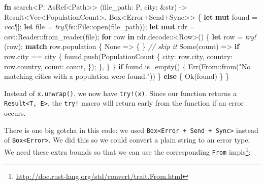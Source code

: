 \documentclass[a4paper,]{book}
\newenvironment{Shaded}{\begin{snugshade}}{\end{snugshade}}
\newcommand{\KeywordTok}[1]{\textcolor[rgb]{0.13,0.29,0.53}{\textbf{{#1}}}}
\newcommand{\DataTypeTok}[1]{\textcolor[rgb]{0.13,0.29,0.53}{{#1}}}
\newcommand{\ConstantTok}[1]{\textcolor[rgb]{0.00,0.00,0.00}{{#1}}}
\newcommand{\StringTok}[1]{\textcolor[rgb]{0.31,0.60,0.02}{{#1}}}
\newcommand{\CommentTok}[1]{\textcolor[rgb]{0.56,0.35,0.01}{\textit{{#1}}}}
\newcommand{\BuiltInTok}[1]{{#1}}
\newcommand{\PreprocessorTok}[1]{\textcolor[rgb]{0.56,0.35,0.01}{\textit{{#1}}}}
\newcommand{\NormalTok}[1]{{#1}}
\renewcommand{\href}[2]{#2\footnote{\url{#1}}}
\begin{document}
\begin{Shaded}
\begin{Highlighting}[]
\KeywordTok{fn} \NormalTok{search<P: AsRef<Path>>}
         \NormalTok{(file_path: P, city: &}\DataTypeTok{str}\NormalTok{)}
         \NormalTok{-> }\DataTypeTok{Result}\NormalTok{<}\DataTypeTok{Vec}\NormalTok{<PopulationCount>, }\DataTypeTok{Box}\NormalTok{<Error+}\BuiltInTok{Send}\NormalTok{+}\BuiltInTok{Sync}\NormalTok{>> \{}
    \KeywordTok{let} \KeywordTok{mut} \NormalTok{found = }\PreprocessorTok{vec!}\NormalTok{[];}
    \KeywordTok{let} \NormalTok{file = }\PreprocessorTok{try!}\NormalTok{(fs::File::open(file_path));}
    \KeywordTok{let} \KeywordTok{mut} \NormalTok{rdr = csv::Reader::from_reader(file);}
    \KeywordTok{for} \NormalTok{row }\KeywordTok{in} \NormalTok{rdr.decode::<Row>() \{}
        \KeywordTok{let} \NormalTok{row = }\PreprocessorTok{try!}\NormalTok{(row);}
        \KeywordTok{match} \NormalTok{row.population \{}
            \ConstantTok{None} \NormalTok{=> \{ \} }\CommentTok{// skip it}
            \ConstantTok{Some}\NormalTok{(count) => }\KeywordTok{if} \NormalTok{row.city == city \{}
                \NormalTok{found.push(PopulationCount \{}
                    \NormalTok{city: row.city,}
                    \NormalTok{country: row.country,}
                    \NormalTok{count: count,}
                \NormalTok{\});}
            \NormalTok{\},}
        \NormalTok{\}}
    \NormalTok{\}}
    \KeywordTok{if} \NormalTok{found.is_empty() \{}
        \ConstantTok{Err}\NormalTok{(From::from(}\StringTok{"No matching cities with a population were found."}\NormalTok{))}
    \NormalTok{\} }\KeywordTok{else} \NormalTok{\{}
        \ConstantTok{Ok}\NormalTok{(found)}
    \NormalTok{\}}
\NormalTok{\}}
\end{Highlighting}
\end{Shaded}

Instead of \texttt{x.unwrap()}, we now have \texttt{try!(x)}. Since our
function returns a \texttt{Result\textless{}T,\ E\textgreater{}}, the
\texttt{try!} macro will return early from the function if an error
occurs.

There is one big gotcha in this code: we used
\texttt{Box\textless{}Error\ +\ Send\ +\ Sync\textgreater{}} instead of
\texttt{Box\textless{}Error\textgreater{}}. We did this so we could
convert a plain string to an error type. We need these extra bounds so
that we can use the
\href{http://doc.rust-lang.org/std/convert/trait.From.html}{corresponding
\texttt{From} impls}:
\end{document}
